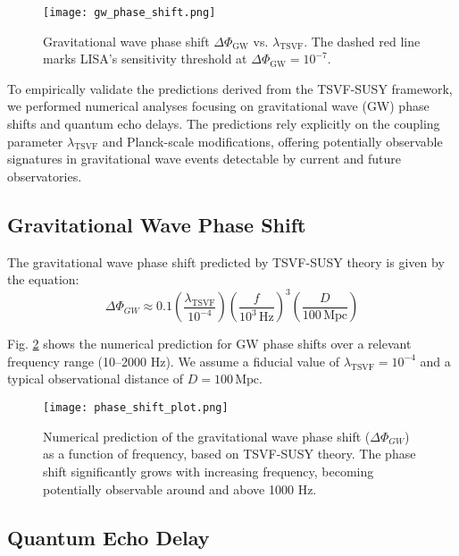 \documentclass[12pt, onecolumn]{article}
\theoremstyle{definition}
\newcommand{\tsvf}{\lambda_{\mathrm{TSVF}}}
\numberwithin{equation}{section}
\begin{document}
\begin{figure}[htbp]  
\centering  
\texttt{[image: gw\_phase\_shift.png]}  
\caption{Gravitational wave phase shift \(\Delta\Phi_{\mathrm{GW}}\) vs. \(\tsvf\).  
The dashed red line marks LISA's sensitivity threshold at \(\Delta\Phi_{\mathrm{GW}} = 10^{-7}\).}  
\label{fig:gw_phase}  
\end{figure}  

To empirically validate the predictions derived from the TSVF-SUSY framework, we performed numerical analyses focusing on gravitational wave (GW) phase shifts and quantum echo delays. The predictions rely explicitly on the coupling parameter $\lambda_{\text{TSVF}}$ and Planck-scale modifications, offering potentially observable signatures in gravitational wave events detectable by current and future observatories.

\subsection{Gravitational Wave Phase Shift}\label{subsec:gw_phase_shift}

The gravitational wave phase shift predicted by TSVF-SUSY theory is given by the equation:
\begin{equation}\label{eq:phase_shift}
\Delta \Phi_{GW} \approx 0.1 \left(\frac{\lambda_{\text{TSVF}}}{10^{-4}}\right) \left(\frac{f}{10^{3}\,\text{Hz}}\right)^3 \left(\frac{D}{100\,\text{Mpc}}\right)
\end{equation}

Fig. \ref{fig:phase_shift} shows the numerical prediction for GW phase shifts over a relevant frequency range (10--2000 Hz). We assume a fiducial value of $\lambda_{\text{TSVF}} = 10^{-4}$ and a typical observational distance of $D=100\,\text{Mpc}$.

\begin{figure}[htbp]
\centering
\texttt{[image: phase\_shift\_plot.png]}
\caption{Numerical prediction of the gravitational wave phase shift ($\Delta \Phi_{GW}$) as a function of frequency, based on TSVF-SUSY theory. The phase shift significantly grows with increasing frequency, becoming potentially observable around and above 1000 Hz.}
\label{fig:phase_shift}
\end{figure}

\subsection{Quantum Echo Delay}\label{subsec:quantum_echo_delay}
\end{document}
